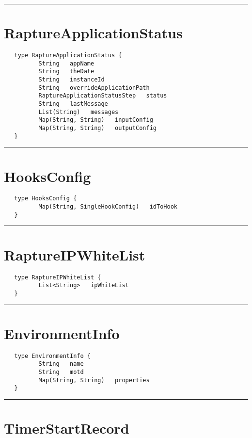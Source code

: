 \rule{15cm}{2pt}
\section{RaptureApplicationStatus}
\label{type:RaptureApplicationStatus}

\begin{verbatim}
   type RaptureApplicationStatus {
          String   appName
          String   theDate
          String   instanceId
          String   overrideApplicationPath
          RaptureApplicationStatusStep   status
          String   lastMessage
          List(String)   messages
          Map(String, String)   inputConfig
          Map(String, String)   outputConfig
   }
\end{verbatim}

\rule{15cm}{2pt}
\section{HooksConfig}
\label{type:HooksConfig}

\begin{verbatim}
   type HooksConfig {
          Map(String, SingleHookConfig)   idToHook
   }
\end{verbatim}

\rule{15cm}{2pt}
\section{RaptureIPWhiteList}
\label{type:RaptureIPWhiteList}

\begin{verbatim}
   type RaptureIPWhiteList {
          List<String>   ipWhiteList
   }
\end{verbatim}

\rule{15cm}{2pt}
\section{EnvironmentInfo}
\label{type:EnvironmentInfo}

\begin{verbatim}
   type EnvironmentInfo {
          String   name
          String   motd
          Map(String, String)   properties
   }
\end{verbatim}

\rule{15cm}{2pt}
\section{TimerStartRecord}
\label{type:TimerStartRecord}

